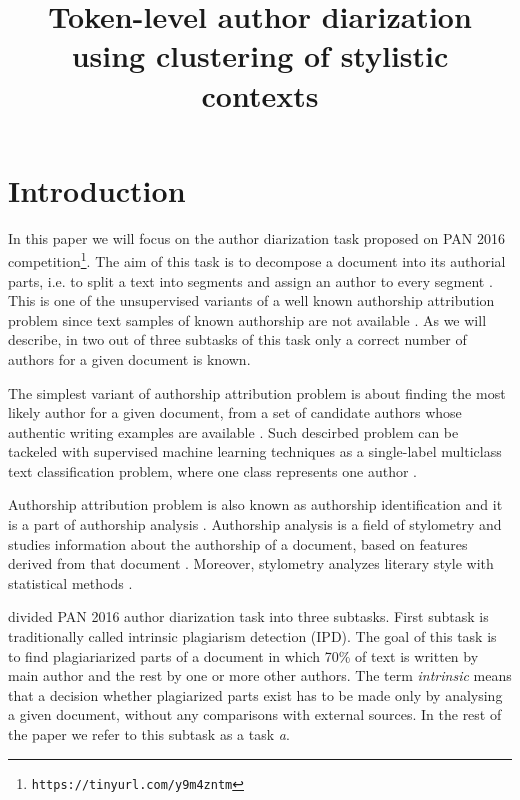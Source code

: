\documentclass[10pt, a4paper]{article}
\title{Token-level author diarization using clustering of stylistic contexts}
\begin{document}
\maketitleabstract

\section{Introduction}
In this paper we will focus on the author diarization task proposed on PAN 2016 competition\footnote{\texttt{https://tinyurl.com/y9m4zntm}}. The aim of this task is to decompose a document into its authorial parts, i.e. to split a text into segments and assign an author to every segment \citep{koppel-2011,aldebei-2015}. This is one of the unsupervised variants of a well known authorship attribution problem since text samples of known authorship are not available \citep{rosso-2016}. As we will describe, in two out of three subtasks of this task only a correct number of authors for a given document is known.

The simplest variant of authorship attribution problem is about finding the most likely author for a given document, from a set of candidate authors whose authentic writing examples are available \citep{stamatatos-2009a,stein-2011,ding-2016}. Such descirbed problem can be tackeled with supervised machine learning techniques as a single-label multiclass text classification problem, where one class represents one author \citep{stamatatos-2009a}. 

Authorship attribution problem is also known as authorship identification and it is a part of authorship analysis \citep{stamatatos-2009a,ding-2016}. Authorship analysis is a field of stylometry and studies information about the authorship of a document, based on features derived from that document \citep{layton-2013}. Moreover, stylometry analyzes literary style with statistical methods  \citep{stein-2011}.	

\citet{rosso-2016} divided PAN 2016 author diarization task into three subtasks. First subtask is traditionally called intrinsic plagiarism detection (IPD). The goal of this task is to find plagiariarized parts of a document in which 70\% of text is written by main author and the rest by one or more other authors. The term \textit{intrinsic} means that a decision whether plagiarized parts exist has to be made only by analysing a given document, without any comparisons with external sources. In the rest of the paper we refer to this subtask as a task \textit{a}.
\end{document}

